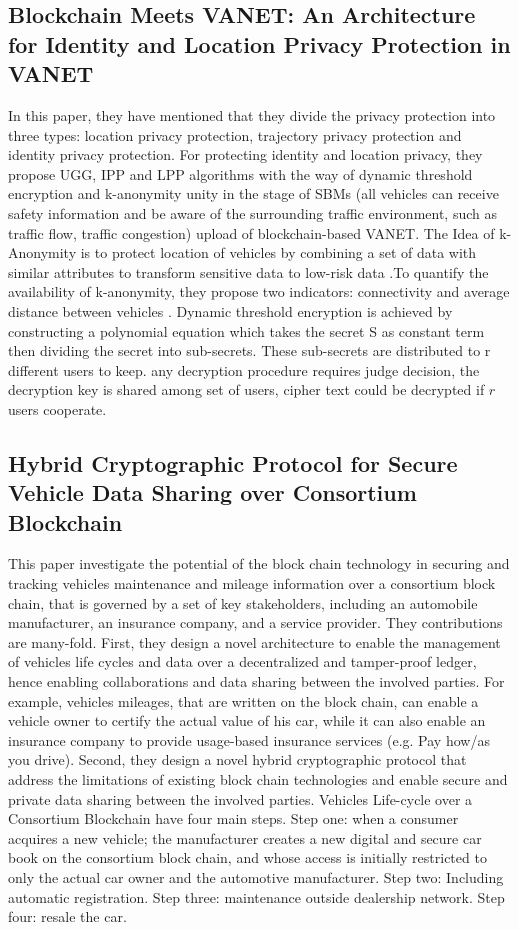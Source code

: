 			\subsection{Blockchain Meets VANET: An Architecture for Identity and Location Privacy Protection in VANET \cite{paper12}}
			In this paper, they have mentioned that they divide the privacy protection into three types: location
			privacy protection, trajectory privacy protection and identity privacy protection. For protecting identity and location privacy, they propose UGG, IPP and LPP algorithms with the way of dynamic threshold encryption and k-anonymity unity in the stage of SBMs (all vehicles can receive safety information and be aware of the surrounding traffic environment, such as traffic flow, traffic congestion) upload of blockchain-based VANET. The Idea of k-Anonymity is to protect location of vehicles by combining a set of data with similar attributes to transform sensitive data to low-risk data .To quantify the availability of k-anonymity, they propose two indicators: connectivity and average distance between vehicles . Dynamic threshold encryption is achieved by constructing a polynomial equation which takes the secret S as constant term then dividing the secret into sub-secrets. These sub-secrets are distributed to r different users to keep. any decryption procedure requires judge decision, the decryption key is shared among set of users, cipher text could be decrypted if $r$ users cooperate. 
			\subsection{Hybrid Cryptographic Protocol for Secure Vehicle Data Sharing over Consortium Blockchain \cite{paper13}}
			This paper investigate the potential of the block chain technology in securing and tracking vehicles maintenance and mileage information over a consortium block chain, that is governed by a set of key stakeholders, including an automobile manufacturer, an insurance company, and a service provider. They contributions are many-fold. First, they design a novel architecture to enable the management of vehicles life cycles and data over a decentralized and tamper-proof ledger, hence enabling collaborations and data sharing between the involved parties. For example, vehicles mileages, that are written on the block chain, can enable a vehicle owner to certify the actual value of his car, while it can also enable an insurance company to provide usage-based insurance services (e.g. Pay how/as you drive). Second, they design a novel hybrid cryptographic protocol that address the limitations of existing block chain technologies and enable secure and private data sharing between the involved parties. Vehicles Life-cycle over a Consortium Blockchain have four main steps. Step one: when a consumer acquires a new vehicle; the manufacturer creates a new digital and secure car book on the consortium block chain, and whose access is initially restricted to only the actual car owner and the automotive manufacturer. Step two: Including automatic registration. Step three: maintenance outside dealership network. Step four: resale the car. 
